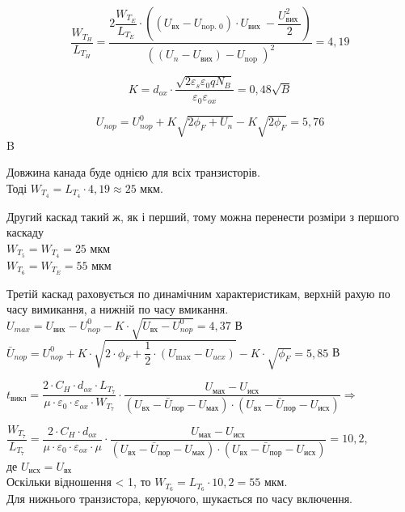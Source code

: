 \documentclass[a4paper,14pt]{extreport}
\begin{document}
	$$
	\dfrac{W_{T_{H}}}{L_{T_{H}}}=
	\dfrac{2 \dfrac{W_{T_{E}}}{L_{T_E}} \cdot\left(\left(U_{\text{вх}}-U_{\text {nop. 0}}\right) \cdot U_{\text {вих }}-
	\dfrac{U_{\text {вих }}^{2}}{2}\right)}{\left(\left(U_{n}-U_{\text{вих}}\right)-U_{\text {nop }}\right)^{2}}=4,19
	$$

	$$  K = d_{ox}\cdot \dfrac{\sqrt{2\varepsilon_s \varepsilon_0 q N_B }}{\varepsilon_0 \varepsilon_{ox}} = 0,48 \sqrt{B}  $$

	$$ U_{nop} =  U_{nop}^0+K\sqrt{2\phi_F+U_n}-K\sqrt{2\phi_F}  = 5,76 $$ B 

	Довжина канада буде однією для всіх транзисторів. \\
	Тоді $W_{T_{4}} =  L_{T_{4}} \cdot 4,19 \approx 25 \text{ мкм}$.

	Другий каскад такий ж, як і перший, тому можна перенести розміри з першого каскаду  \\
	$W_{T_{5}}=W_{T_{4}}=25  \text{ мкм}$\\
	$W_{T_{6}}=W_{T_{E}}=55  \text{ мкм}$

	Третій каскад раховується по динамічним характеристикам, верхній рахую по часу  вимикання, а нижній по часу вмикання.\\
	$U_{m a x}=U_{\text{вих}}-U_{n o p}^{0}-K \cdot \sqrt{U_{\text{вх}}-U_{n o p}^{0}}=4,37 $ В\\
	$\bar{U}_{n o p}=U_{n o p}^{0}+K \cdot \sqrt{2 \cdot \phi_{F}+\dfrac{1}{2} \cdot\left(U_{\max }-U_{u c x}\right)}-K \cdot \sqrt{\phi_{F}}=5,85$ В


	$t_{\text{викл}} = \dfrac{2\cdot C_H \cdot d_{ox} \cdot L_{T_{7}}}{\mu \cdot \varepsilon_0 \cdot \varepsilon_{ox} \cdot W_{T_{7}}} \cdot
	\dfrac{U_{\text{мах}} - U_{\text{исх}}}{(U_{\text{вх}} - \bar{U}_{\text{пор}} - U_{\text{мах}})\cdot(U_{\text{вх}} - \bar{U}_{\text{пор}} - U_{\text{исх}})} \Rightarrow$

	$ \dfrac{W_{T_{7}}}{L_{T_{7}}} =
	\dfrac{2\cdot C_H \cdot d_{ox} }{\mu \cdot \varepsilon_0 \cdot \varepsilon_{ox} \cdot\mu} \cdot
	\dfrac{U_{\text{мах}} - U_{\text{исх}}}{(U_{\text{вх}} - \bar{U}_{\text{пор}} - U_{\text{мах}})\cdot(U_{\text{вх}} - \bar{U}_{\text{пор}} - U_{\text{исх}})} = 10,2$,  \\

	де  $U_{\text{исх}} = U_{\text{вх}}$\\

	Оскільки відношення < 1,  то $W_{T_{6}} = L_{T_{6}} \cdot 10,2 =  55$ мкм.\\

	Для нижнього транзистора, керуючого, шукається по часу включення.\\
\end{document}
